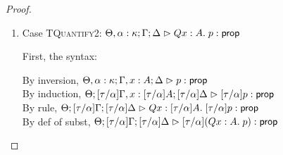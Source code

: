 \begin{proof}
\begin{enumerate}
  For semantics, consider
  $\interp{\judgeA[\Theta; {[\tau/\alpha]}\Gamma; {[\tau/\alpha]}\Delta]
                  {{[\tau/\alpha]}(Q u:\upsilon.\;p)}{\assert}}\;\theta\;\gamma\;\delta$ 
  \begin{eqnproof}
          {Semantics}
          {Induction}
          {Semantics}
  \end{eqnproof}

  The correctness of the application of $\gamma$ and $\delta$ follows from the equations for
  contexts under substitution.


\item Case \textsc{TQuantify2}: $\judgeA[\Theta, \alpha:\kappa; \Gamma; \Delta]{Q x:A.\;p}{\assert}$
  
  First, the syntax:
  \begin{tabbedproof}
    \oo By inversion, $\judgeA[\Theta, \alpha:\kappa; \Gamma, x:A; \Delta]{p}{\assert}$ \\
    \oo By induction, $\judgeA[\Theta; {[\tau/\alpha]}\Gamma, x:{[\tau/\alpha]}A; {[\tau/\alpha]}\Delta]{{[\tau/\alpha]}p}{\assert}$ \\
    \oo By rule, $\judgeA[\Theta; {[\tau/\alpha]}\Gamma; {[\tau/\alpha]}\Delta]
                         {Q x:{[\tau/\alpha]}A.\;{[\tau/\alpha]}p}{\assert}$ \\
    \oo By def of subst, $\judgeA[\Theta; {[\tau/\alpha]}\Gamma; {[\tau/\alpha]}\Delta]
                                 {{[\tau/\alpha]}(Q x:A.\;p)}{\assert}$ 
  \end{tabbedproof}


\end{enumerate}
\end{proof}
